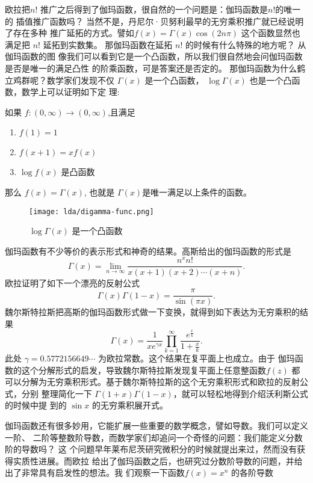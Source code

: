 欧拉把$n!$ 推广之后得到了伽玛函数，很自然的一个问题是：伽玛函数是$n!$的唯一的
插值推广函数吗？ 当然不是，丹尼尔·贝努利最早的无穷乘积推广就已经说明了存在多种
推广延拓的方式。譬如$f(x) = \Gamma(x) \cos (2n\pi)$ 这个函数显然也满足把 $n!$
延拓到实数集。 那伽玛函数在延拓 $n!$ 的时候有什么特殊的地方呢？ 从伽玛函数的图
像我们可以看到它是一个凸函数，所以我们很自然地会问伽玛函数是否是唯一的满足凸性
的阶乘函数，可是答案还是否定的。 那伽玛函数为什么鹤立鸡群呢？数学家们发现不仅
$\Gamma(x)$ 是一个凸函数， $\log\Gamma(x)$ 也是一个凸函数，数学上可以证明如下定
理:
\begin{theorem} 如果 $f:(0,\infty)\rightarrow (0,\infty)$,且满足
\begin{enumerate}
\item $f(1) = 1$
\item $f(x+1) = xf(x)$
\item $\log f(x)$ 是凸函数
\end{enumerate}
那么 $f(x) = \Gamma(x)$, 也就是 $\Gamma(x)$是唯一满足以上条件的函数。
\end{theorem}

\begin{figure}[htbp]
\centering
\texttt{[image: lda/digamma-func.png]}
\caption{$\log \Gamma(x)$ 是一个凸函数}
\end{figure}

伽玛函数有不少等价的表示形式和神奇的结果。高斯给出的伽玛函数的形式是
$$ \Gamma(x) = \lim_{n\rightarrow\infty} \frac{n^x n!}{x(x+1)(x+2)\cdots(x+n)} .$$
欧拉证明了如下一个漂亮的反射公式
$$ \Gamma(x) \Gamma(1-x) = \frac{\pi}{\sin (\pi x)} .$$
魏尔斯特拉斯把高斯的伽玛函数形式做一下变换，就得到如下表达为无穷乘积的结果
$$ {\Gamma(x)} = \frac{1}{xe^{\gamma x}} \prod_{k=1}^\infty
\frac{e^{\frac{x}{k}}} {1+\frac{x}{k}} .$$
此处 $\gamma = 0.5772156649\cdots$ 为欧拉常数。这个结果在复平面上也成立。由于
伽玛函数的这个分解形式的启发，导致魏尔斯特拉斯发现复平面上任意整函数$f(z)$
都可以分解为无穷乘积形式。基于魏尔斯特拉斯的这个无穷乘积形式和欧拉的反射公式，分别
整理简化一下 $\Gamma(1+x)\Gamma(1-x)$，就可以轻松地得到介绍沃利斯公式的时候中提
到的 $\sin x$ 的无穷乘积展开式。 

伽玛函数还有很多妙用，它能扩展一些重要的数学概念，譬如导数。我们可以定义一阶、
二阶等整数阶导数，而数学家们却追问一个奇怪的问题：我们能定义分数阶的导数吗？ 这
个问题早年莱布尼茨研究微积分的时候就提出来过，然而没有获得实质性进展。而欧拉
给出了伽玛函数之后，也研究过分数阶导数的问题，并给出了非常具有启发性的想法。我
们观察一下函数$f(x) = x^n$ 的各阶导数

